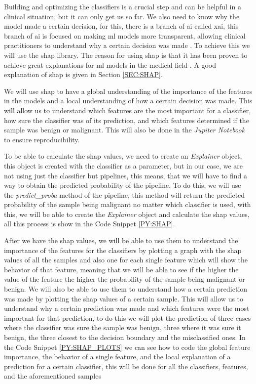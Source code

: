 Building and optimizing the classifiers is a crucial step and can be helpful in a clinical situation, but it can only get us so far. We also need to know why the model made a certain decision, for this, there is a branch of \ac{ai} called \acl{xai}, this branch of \ac{ai} is focused on making \ac{ml} models more transparent, allowing clinical practitioners to understand why a certain decision was made \cite{borys_explainable_2023}. To achieve this we will use the \acl{shap} library. The reason for using \ac{shap} is that it has been proven to achieve great explanations for \ac{ml} models in the medical field \cite{massafra_analyzing_2023}. A good explanation of \ac{shap} is given in Section \ref{SEC:SHAP}.

We will use \ac{shap} to have a global understanding of the importance of the features in the models and a local understanding of how a certain decision was made. This will allow us to understand which features are the most important for a classifier, how sure the classifier was of its prediction, and which features determined if the sample was benign or malignant. This will also be done in the \textit{Jupiter Notebook} to ensure reproducibility.

To be able to calculate the \ac{shap} values, we need to create an \textit{Explainer} object, this object is created with the classifier as a parameter, but in our case, we are not using just the classifier but pipelines, this means, that we will have to find a way to obtain the predicted probability of the pipeline. To do this, we will use the \textit{predict\_proba} method of the pipeline, this method will return the predicted probability of the sample being malignant no matter which classifier is used, with this, we will be able to create the \textit{Explainer} object and calculate the \ac{shap} values, all this process is show in the Code Snippet \ref{PY:SHAP}.

After we have the \ac{shap} values, we will be able to use them to understand the importance of the features for the classifiers by plotting a graph with the \ac{shap} values of all the samples and also one for each single feature which will show the behavior of that feature, meaning that we will be able to see if the higher the value of the feature the higher the probability of the sample being malignant or benign. We will also be able to use them to understand how a certain prediction was made by plotting the \ac{shap} values of a certain sample. This will allow us to understand why a certain prediction was made and which features were the most important for that prediction, to do this we will plot the prediction of three cases where the classifier was sure the sample was benign, three where it was sure it benign, the three closest to the decision boundary and the misclassified ones. In the Code Snippet \ref{PY:SHAP_PLOTS} we can see how to code the global feature importance, the behavior of a single feature, and the local explanation of a prediction for a certain classifier, this will be done for all the classifiers, features, and the aforementioned samples

